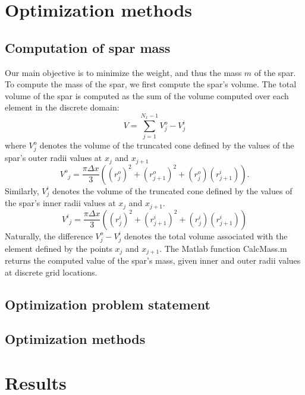 \documentclass[11pt]{article}
\begin{document}
\section{Optimization methods}

\subsection{Computation of spar mass}

Our main objective is to minimize the weight, and thus
the mass $m$ of the spar. To compute the mass of the
spar, we first compute the spar's volume. The total volume
of the spar is computed as the sum of the volume computed
over each element in the discrete domain:
\begin{equation}
V = \sum^{N_x-1}_{j=1} V^o_j - V^i_j
\end{equation}
where $V^o_j$ denotes the volume of the truncated cone
defined by the values of the spar's outer
radii values at $x_j$ and $x_{j+1}$
\begin{equation}
{V^o}_j = \frac{\pi \Delta x}{3} ((r^o_j)^2 + (r^o_{j+1})^2 + (r^o_j)(r^i_{j+1})).
\end{equation}
Similarly, $V^i_j$ denotes the volume of the truncated cone
defined by the values of the spar's inner
radii values at $x_j$ and $x_{j+1}$.
\begin{equation}
{V^i}_j = \frac{\pi \Delta x}{3} ((r^i_j)^2 + (r^i_{j+1})^2 + (r^i_j) (r^i_{j+1}))
\end{equation}
Naturally, the difference $V^o_j-V^i_j$ denotes the
total volume associated with the element defined
by the points $x_j$ and $x_{j+1}$. The Matlab
function CalcMass.m returns the computed value
of the spar's mass, given inner and outer radii
values at discrete grid locations.

\subsection{Optimization problem statement}



\subsection{Optimization methods}

\section{Results}
\end{document}
